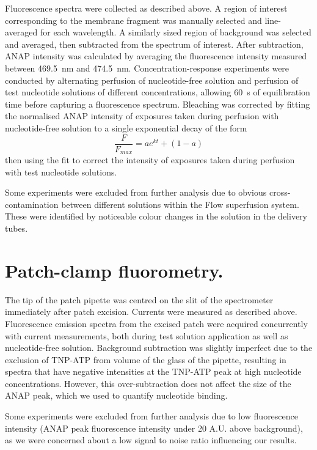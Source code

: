 Fluorescence spectra were collected as described above.
A region of interest corresponding to the membrane fragment was manually selected and line-averaged for each wavelength.
A similarly sized region of background was selected and averaged, then subtracted from the spectrum of interest.
After subtraction, ANAP intensity was calculated by averaging the fluorescence intensity measured between \SI{469.5}{\nano\metre} and \SI{474.5}{\nano\metre}.
Concentration-response experiments were conducted by alternating perfusion of nucleotide-free solution and perfusion of test nucleotide solutions of different concentrations, allowing \SI{60}{\second} of equilibration time before capturing a fluorescence spectrum.
Bleaching was corrected by fitting the normalised ANAP intensity of exposures taken during perfusion with nucleotide-free solution to a single exponential decay of the form
\begin{equation} \label{eq:bleaching}
    \frac{F}{F_{max}} = ae^{kt} + (1 - a)
\end{equation}
then using the fit to correct the intensity of exposures taken during perfusion with test nucleotide solutions.

Some experiments were excluded from further analysis due to obvious cross-contamination between different solutions within the \si{\micro}Flow superfusion system.
These were identified by noticeable colour changes in the solution in the delivery tubes.

\section{Patch-clamp fluorometry.}
The tip of the patch pipette was centred on the slit of the spectrometer immediately after patch excision.
Currents were measured as described above.
Fluorescence emission spectra from the excised patch were acquired concurrently with current measurements, both during test solution application as well as nucleotide-free solution.
Background subtraction was slightly imperfect due to the exclusion of TNP-ATP from volume of the glass of the pipette, resulting in spectra that have negative intensities at the TNP-ATP peak at high nucleotide concentrations.
However, this over-subtraction does not affect the size of the ANAP peak, which we used to quantify nucleotide binding.

Some experiments were excluded from further analysis due to low fluorescence intensity (ANAP peak fluorescence intensity under 20 A.U. above background), as we were concerned about a low signal to noise ratio influencing our results.

